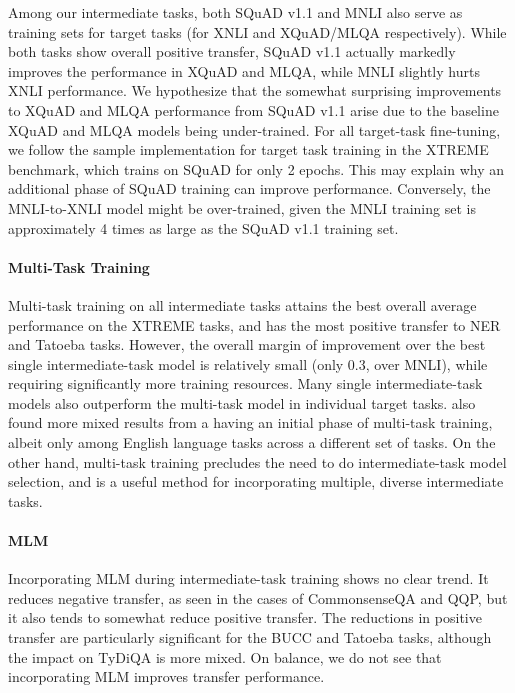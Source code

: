 \documentclass[11pt,a4paper]{article}
\begin{document}
Among our intermediate tasks, both SQuAD v1.1 and MNLI also serve as training sets for target tasks (for XNLI and XQuAD/MLQA respectively). While both tasks show overall positive transfer, SQuAD v1.1 actually markedly improves the performance in XQuAD and MLQA, while MNLI slightly hurts XNLI performance. We hypothesize that the somewhat surprising improvements to XQuAD and MLQA performance from SQuAD v1.1 arise due to the baseline XQuAD and MLQA models being under-trained. For all target-task fine-tuning, we follow the sample implementation for target task training in the XTREME benchmark, which trains on SQuAD for only 2 epochs. This may explain why an additional phase of SQuAD training can improve performance. Conversely, the MNLI-to-XNLI model might be over-trained, given the MNLI training set is approximately 4 times as large as the SQuAD v1.1 training set.


\paragraph{Multi-Task Training}
Multi-task training on all intermediate tasks attains the best overall average performance on the XTREME tasks, and has the most positive transfer to NER and Tatoeba tasks. However, the overall margin of improvement over the best single intermediate-task model is relatively small (only 0.3, over MNLI), while requiring significantly more training resources. Many single intermediate-task models also outperform the multi-task model in individual target tasks. \citet{wang-etal-2019-tell} also found more mixed results from a having an initial phase of multi-task training, albeit only among English language tasks across a different set of tasks. On the other hand, multi-task training precludes the need to do intermediate-task model selection, and is a useful method for incorporating multiple, diverse intermediate tasks.  

\paragraph{MLM}

Incorporating MLM during intermediate-task training shows no clear trend. It reduces negative transfer, as seen in the cases of CommonsenseQA and QQP, but it also tends to somewhat reduce positive transfer. The reductions in positive transfer are particularly significant for the BUCC and Tatoeba tasks, although the impact on TyDiQA is more mixed. On balance, we do not see that incorporating MLM improves transfer performance. 
\end{document}
